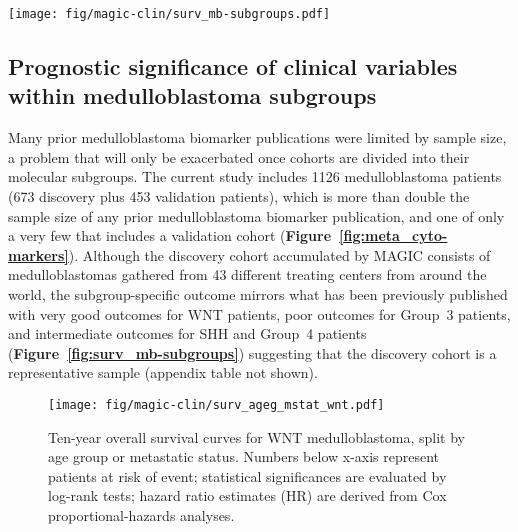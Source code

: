 \documentclass[11pt,letterpaper]{article}
\theoremstyle{definition}
\newcommand{\emphlab}[1]{\textbf{\textsf{#1}}}
\newcommand{\citefig}[1]{\emphlab{Figure~\ref{fig:#1}}}
\begin{document}
\begin{SCfigure}[5][b]
	\texttt{[image: fig/magic-clin/surv\_mb-subgroups.pdf]}
	\caption[Overall survival curves for molecular subgroups of medulloblastoma]
	{
	Overall survival curves for molecular subgroups of medulloblastoma.
	Numbers below x-axis represent patients at risk of event; statistical significances are evaluated by log-rank tests; hazard ratio estimates (HR) are derived from Cox proportional-hazards analyses.
	}
	\label{fig:surv_mb-subgroups}
\end{SCfigure}

\clearpage

\subsection{Prognostic significance of clinical variables within medulloblastoma subgroups}

Many prior medulloblastoma biomarker publications were limited by sample size, a problem that will only be exacerbated once cohorts are divided into their molecular subgroups.  The current study includes 1126 medulloblastoma patients (673 discovery plus 453 validation patients), which is more than double the sample size of any prior medulloblastoma biomarker publication, and one of only a very few that includes a validation cohort (\citefig{meta_cyto-markers}). Although the discovery cohort accumulated by MAGIC consists of medulloblastomas gathered from 43 different treating centers from around the world, the subgroup-specific outcome mirrors what has been previously published with very good outcomes for WNT patients, poor outcomes for Group~3 patients, and intermediate outcomes for SHH and Group~4 patients (\citefig{surv_mb-subgroups}) suggesting that the discovery cohort is a representative sample (appendix table not shown).

\begin{figure}[h]
	\begin{center}
		\texttt{[image: fig/magic-clin/surv\_ageg\_mstat\_wnt.pdf]}
	\end{center}
	\caption[Ten-year overall survival curves for WNT medulloblastoma]
	{
	Ten-year overall survival curves for WNT medulloblastoma, split by age group or metastatic status.
	Numbers below x-axis represent patients at risk of event; statistical significances are evaluated by log-rank tests; hazard ratio estimates (HR) are derived from Cox proportional-hazards analyses.
	}
	\label{fig:surv_ageg_mstat_wnt}
\end{figure}
\end{document}

